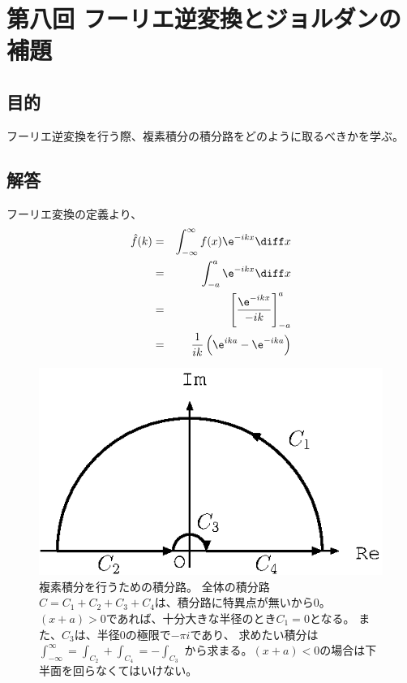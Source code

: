 \section{第八回 フーリエ逆変換とジョルダンの補題}

\subsection{目的}

フーリエ逆変換を行う際、複素積分の積分路をどのように取るべきかを学ぶ。

\subsection{解答}


フーリエ変換の定義より、
\begin{eqnarray}
  \hat{f}(k) &=& \int_{-\infty}^{\infty} f(x) \e^{-ikx} \diff x \\
  &=& \int_{-a}^{a} \e^{-ikx} \diff x \\
  &=& \left[ \frac{\e^{-ikx}}{-ik}  \right]_{-a}^a\\
  &=& \frac{1}{ik} \left( \e^{ika} - \e^{-ika} \right)
\end{eqnarray}

\begin{figure}[htbp]
  \begin{center}
    \includegraphics[width=.5\linewidth]{fig/jordan2.eps}
  \end{center}
  \caption{
    複素積分を行うための積分路。
    全体の積分路$C = C_1+C_2+C_3+C_4$は、積分路に特異点が無いから$0$。
    $(x+a)>0$であれば、十分大きな半径のとき$C_1=0$となる。
    また、$C_3$は、半径$0$の極限で$-\pi i $であり、
    求めたい積分は
    $
      \int_{-\infty}^{\infty} = \int_{C_2}+\int_{C_4} = -\int_{C_3}
    $
    から求まる。$(x+a)<0$の場合は下半面を回らなくてはいけない。
  }
  \label{fig_jordan2}
\end{figure}

